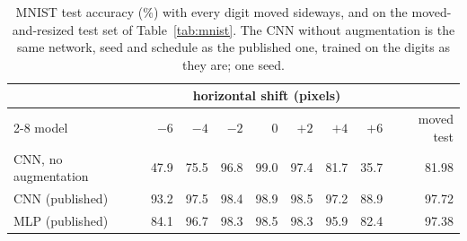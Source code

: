 \begin{table}[H]
\centering
\begin{tabular}{@{}lrrrrrrrr@{}}
\toprule
 & \multicolumn{7}{c}{horizontal shift (pixels)} & \\
\cmidrule(lr){2-8}
model & $-6$ & $-4$ & $-2$ & $0$ & $+2$ & $+4$ & $+6$ & moved test \\
\midrule
CNN, no augmentation & 47.9 & 75.5 & 96.8 & 99.0 & 97.4 & 81.7 & 35.7 & 81.98 \\
CNN (published) & 93.2 & 97.5 & 98.4 & 98.9 & 98.5 & 97.2 & 88.9 & 97.72 \\
MLP (published) & 84.1 & 96.7 & 98.3 & 98.5 & 98.3 & 95.9 & 82.4 & 97.38 \\
\bottomrule
\end{tabular}
\caption{MNIST test accuracy (\%) with every digit moved sideways, and on the moved-and-resized test set of Table~\ref{tab:mnist}. The CNN without augmentation is the same network, seed and schedule as the published one, trained on the digits as they are; one seed.}
\label{tab:shift}
\end{table}
